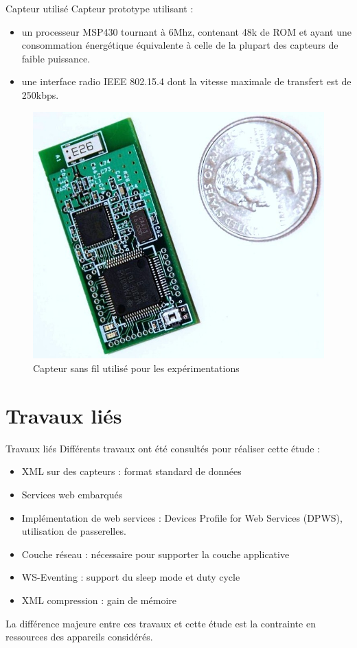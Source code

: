 \begin{frame}{Capteur utilisé}
Capteur prototype utilisant :
\begin{itemize}
\item un processeur MSP430 tournant à 6Mhz, contenant 48k de ROM et ayant une consommation énergétique équivalente à celle de la plupart des capteurs de faible puissance.
\item une interface radio IEEE 802.15.4 dont la vitesse maximale de transfert est de 250kbps.
\end{itemize}
\begin{figure}
  \centering
  \includegraphics[scale=0.15]{figures/tws08-000.jpg}
  \caption{Capteur sans fil utilisé pour les expérimentations}
 \end{figure} 
\end{frame}

\section{Travaux liés}
\begin{frame}{Travaux liés}
Différents travaux ont été consultés pour réaliser cette étude :
\begin{itemize}
\item XML sur des capteurs : format standard de données
\item Services web embarqués 
\item Implémentation de web services : Devices Profile for Web Services (DPWS), utilisation de passerelles.
\item Couche réseau : nécessaire pour supporter la couche applicative
\item WS-Eventing : support du sleep mode et duty cycle
\item XML compression : gain de mémoire
\end{itemize}
La différence majeure entre ces travaux et cette étude est la contrainte en ressources des appareils considérés.
\end{frame}
